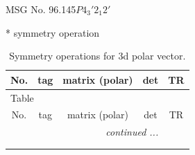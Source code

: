 \documentclass[fleqn,8pt]{jsarticle}
\begin{document}
\setcounter{MaxMatrixCols}{32}

\renewcommand{\tablename}{Table~}
\renewcommand{\figurename}{Figure~}
\begin{center}
\LARGE
MSG No. 96.145\quad$P4_{3}'2_{1}2'$
\end{center}
* symmetry operation
\renewcommand{\arraystretch}{1.3}
\begin{longtable}{ccccc}
\caption{Symmetry operations for 3d polar vector.}
 \\
 \hline \hline
No. & tag & matrix (polar) & det & TR \\ \hline \endfirsthead

\multicolumn{4}{l}{\tablename\ \thetable{}} \\
 \hline \hline
No. & tag & matrix (polar) & det & TR \\ \hline \endhead

 \hline \hline
\multicolumn{4}{r}{\footnotesize\it continued ...} \\ \endfoot

 \hline \hline
\multicolumn{4}{r}{} \\ \endlastfoot


\end{longtable}
\end{document}
